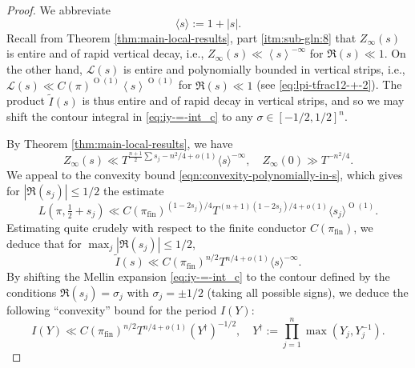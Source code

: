 \documentclass[reqno]{amsart}
\def\O{\operatorname{O}}
\DeclareMathOperator{\fin}{fin}
\theoremstyle{plain} \newtheorem{theorem} {Theorem}
\theoremstyle{definition} \newtheorem{definition} [theorem] {Definition}
\theoremstyle{itplain} %
\numberwithin{equation}{section}
\numberwithin{theorem}{section}
\renewcommand{\leq}{\leqslant}
\begin{document}
\begin{proof}
We abbreviate
\begin{equation*}
  \langle s \rangle := 1 + |s|.
\end{equation*}
Recall from Theorem \ref{thm:main-local-results}, part \eqref{itm:sub-gln:8} that $Z_\infty(s)$ is entire and of rapid vertical decay, i.e., $Z_\infty(s) \ll \left\langle s \right\rangle^{-\infty}$ for $\Re(s) \ll 1$.  On the other hand, $\mathcal{L}(s)$ is entire and polynomially bounded in vertical strips, i.e., $\mathcal{L}(s) \ll C(\pi)^{\O(1)} \left\langle s \right\rangle^{\O(1)}$ for $\Re(s) \ll 1$ (see \eqref{eq:lpi-tfrac12-+-2}).  The product $\tilde{I}(s)$ is thus entire and of rapid decay in vertical strips, and so we may shift the contour integral in \eqref{eq:iy-=-int_c} to any $\sigma \in [-1/2, 1/2]^n$.

  By Theorem \ref{thm:main-local-results}, we have
  \[
    Z_\infty(s) \ll T^{\frac{n+1}{2} \sum s_j - n^2/4 + o(1)} \langle s \rangle^{-\infty},
    \quad
    Z_\infty(0) \gg T^{-{n^2}/{4}}.
  \]
  We appeal to the convexity bound \eqref{eqn:convexity-polynomially-in-s}, which gives for $|\Re(s_j)| \leq 1/2$ the estimate
  \begin{equation*}
    L(\pi, \tfrac{1}{2} +s_j)
    \ll
    C(\pi_{\fin})^{(1 - 2 s_j)/4}
    T^{(n+1)(1 - 2 s_j)/4 + o(1)}
    \langle s_j \rangle^{\O(1)}.
  \end{equation*}
  Estimating quite crudely with respect to the finite conductor $C(\pi_{\fin})$, we deduce that for $\max_j |\Re(s_j)| \leq 1/2$,
  \begin{equation*}
    \tilde{I}(s)
    \ll
    C(\pi_{\fin})^{n/2}
    T^{n/4 + o(1) }
    \langle s \rangle^{-\infty}.
  \end{equation*}
  By shifting the Mellin expansion \eqref{eq:iy-=-int_c} to the contour defined by the conditions $\Re(s_j) = \sigma_j$ with $\sigma_j = \pm 1/2$ (taking all possible signs), we deduce the following ``convexity'' bound for the period $I(Y)$:
  \begin{equation}\label{eq:iy-ll-t}
    I(Y) \ll
    C(\pi_{\fin})^{n/2}
    T^{n/4 + o(1) }
    (Y ^\dagger )^{-1/2},
    \quad
    Y ^\dagger :=
    \prod_{j=1}^n
    \max(Y_j, Y_j^{-1}).
  \end{equation}


\end{proof}
\end{document}
